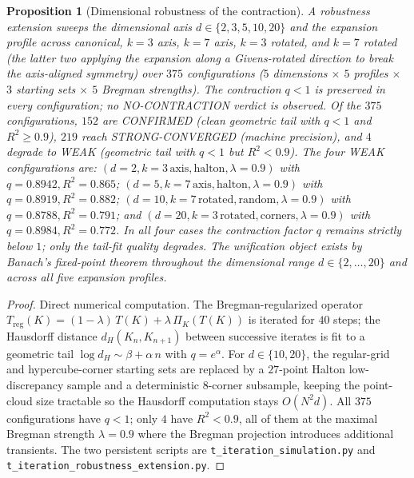 \documentclass[11pt,a4paper]{article}
\theoremstyle{plain}
\newtheorem{proposition}[theorem]{Proposition}
\theoremstyle{definition}
\theoremstyle{remark}
\begin{document}
\begin{proposition}[Dimensional robustness of the contraction]
\label{prop:titer}
A robustness extension sweeps the dimensional axis
$d\in\{2, 3, 5, 10, 20\}$ and the expansion profile across
\emph{canonical}, \emph{$k{=}3$ axis}, \emph{$k{=}7$ axis},
\emph{$k{=}3$ rotated}, and \emph{$k{=}7$ rotated} (the latter two
applying the expansion along a Givens-rotated direction to break the
axis-aligned symmetry) over $375$ configurations
($5$ dimensions $\times$ $5$ profiles $\times$ $3$ starting sets
$\times$ $5$ Bregman strengths). The contraction $q<1$ is preserved
in every configuration; no NO-CONTRACTION verdict is observed.
Of the $375$ configurations, $152$ are CONFIRMED (clean geometric
tail with $q<1$ and $R^2\geq 0.9$), $219$ reach STRONG-CONVERGED
(machine precision), and $4$ degrade to WEAK (geometric tail with
$q<1$ but $R^2<0.9$). The four WEAK configurations are: $(d=2,
k{=}3\,\text{axis}, \text{halton}, \lambda{=}0.9)$ with $q=0.8942,
R^2=0.865$; $(d=5, k{=}7\,\text{axis}, \text{halton}, \lambda{=}0.9)$
with $q=0.8919, R^2=0.882$; $(d=10, k{=}7\,\text{rotated},
\text{random}, \lambda{=}0.9)$ with $q=0.8788, R^2=0.791$; and
$(d=20, k{=}3\,\text{rotated}, \text{corners}, \lambda{=}0.9)$ with
$q=0.8984, R^2=0.772$. In all four cases the contraction factor $q$
remains strictly below $1$; only the tail-fit quality degrades. The
unification object exists by Banach's fixed-point theorem throughout
the dimensional range $d\in\{2,\ldots,20\}$ and across all five
expansion profiles.
\end{proposition}

\begin{proof}
\begin{sloppypar}
Direct numerical computation. The Bregman-regularized operator
$T_{\mathrm{reg}}(K) = (1-\lambda)\,T(K) + \lambda\,\Pi_K(T(K))$ is
iterated for $40$ steps; the Hausdorff distance $d_H(K_n, K_{n+1})$
between successive iterates is fit to a geometric tail
$\log d_H \sim \beta + \alpha\,n$ with $q = e^\alpha$. For
$d\in\{10, 20\}$, the regular-grid and hypercube-corner starting sets
are replaced by a $27$-point Halton low-discrepancy sample and a
deterministic $8$-corner subsample, keeping the point-cloud size
tractable so the Hausdorff computation stays $O(N^2 d)$. All $375$
configurations have $q<1$; only $4$ have $R^2<0.9$, all of them at the
maximal Bregman strength $\lambda=0.9$ where the Bregman projection
introduces additional transients. The two persistent scripts are
\texttt{t\_iteration\_simulation.py} and
\texttt{t\_iteration\_robustness\_extension.py}.
\end{sloppypar}
\end{proof}
\end{document}
